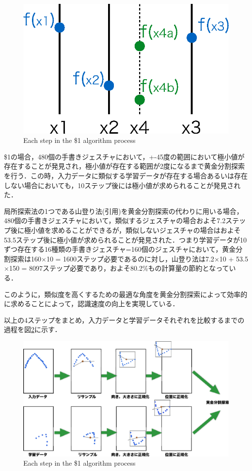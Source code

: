 \begin{figure} [!h]
\centering
\includegraphics [width=0.8\columnwidth]{img/golden.eps}
\caption{Each step in the \$1 algorithm process}
\label{fig:golden}
\end{figure}

\$1の場合，480個の手書きジェスチャにおいて，+-45度の範囲において極小値が存在することが発見され，極小値が存在する範囲が2度になるまで黄金分割探索を行う．この時，入力データに類似する学習データが存在する場合あるいは存在しない場合においても，10ステップ後には極小値が求められることが発見された．

局所探索法の1つである山登り法(引用)を黄金分割探索の代わりに用いる場合，480個の手書きジェスチャにおいて，類似するジェスチャの場合およそ7.2ステップ後に極小値を求めることができるが，類似しないジェスチャの場合はおよそ53.5ステップ後に極小値が求められることが発見された．つまり学習データが10ずつ存在する16種類の手書きジェスチャ=160個のジェスチャにおいて，黄金分割探索は160$\times$10 = 1600ステップ必要であるのに対し，山登り法は7.2$\times$10 + 53.5$\times$150 = 8097ステップ必要であり，およそ80.2\%もの計算量の節約となっている．

このように，類似度を高くするための最適な角度を黄金分割探索によって効率的に求めることによって，認識速度の向上を実現している．

以上の4ステップをまとめ，入力データと学習データそれぞれを比較するまでの過程を図\ref{fig:onedoller_flow}に示す．
\begin{figure} [!h]
\centering
\includegraphics [width=0.8\columnwidth]{img/onedoller_flow.eps}
\caption{Each step in the \$1 algorithm process}
\label{fig:onedoller_flow}
\end{figure}

